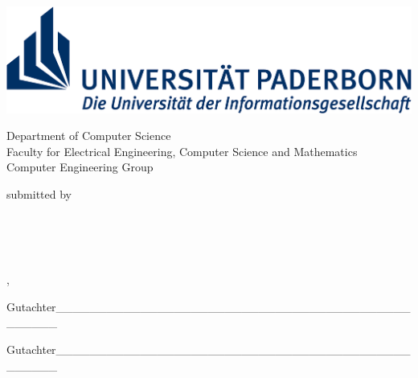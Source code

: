 \begin{titlepage}

\begin{center}   
	
\includegraphics[width=\textwidth]{__pics/uni-logo}	

\medskip

Department of Computer Science\\	Faculty for Electrical Engineering, Computer Science and Mathematics\\Computer Engineering Group
\bigskip\bigskip\bigskip\bigskip


\begingroup
\color{Maroon}\spacedallcaps{\Large{\textbf{\myTitle}}}
\endgroup
\bigskip

\textbf{\myThesisType}

\medskip

submitted by


\medskip

\myName\\ \myAdress\\ \myNumber\\ 

\medskip

\myLocation, \myTime

\bigskip










\vfill

%
%

Gutachter\_\_\_\_\_\_\_\_\_\_\_\_\_\_\_\_\_\_\_\_\_\_\_\_\_\_\_\_\_\_\_\_\_\_\_\_\_\_\_\_\_\_\_\_\_\_\_\_
\raggedleft{\myProf}

\bigskip

Gutachter\_\_\_\_\_\_\_\_\_\_\_\_\_\_\_\_\_\_\_\_\_\_\_\_\_\_\_\_\_\_\_\_\_\_\_\_\_\_\_\_\_\_\_\_\_\_\_\_
\raggedleft{\myOtherProf}


\end{center}  
\end{titlepage}   